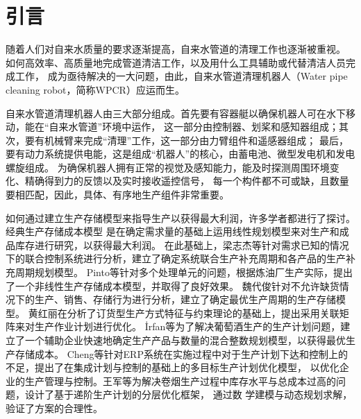 %
%
%
%
%

\chapter{引言}

随着人们对自来水质量的要求逐渐提高，自来水管道的清理工作也逐渐被重视。
如何高效率、高质量地完成管道清洁工作，以及用什么工具辅助或代替清洁人员完成工作，
成为亟待解决的一大问题，由此，自来水管道清理机器人（Water pipe cleaning robot，简称WPCR）应运而生。

自来水管道清理机器人由三大部分组成。首先要有容器艇以确保机器人可在水下移动，能在“自来水管道”环境中运作，
这一部分由控制器、划桨和感知器组成；其次，要有机械臂来完成“清理”工作，这一部分由力臂组件和遥感器组成；
最后，要有动力系统提供电能，这是组成“机器人”的核心，由蓄电池、微型发电机和发电螺旋组成。
为确保机器人拥有正常的视觉及感知能力，能及时探测周围环境变化、精确得到力的反馈以及实时接收遥控信号，
每一个构件都不可或缺，且数量要相匹配，因此，具体、有序地生产组件非常重要。

如何通过建立生产存储模型来指导生产以获得最大利润，许多学者都进行了探讨。
经典生产存储成本模型\cite{王周宏2011运筹学基础} 是在确定需求量的基础上运用线性规划模型来对生产和成品库存进行研究，以获得最大利润。
在此基础上，梁志杰等\cite{梁志杰2004联合生产存储问题的模拟退火算法}针对需求已知的情况下的联合控制系统进行分析，建立了确定系统联合生产补充周期和各产品的生产补充周期规划模型。
Pinto等\cite{pinto2000planning}针对多个处理单元的问题，根据炼油厂生产实际，提出了一个非线性生产存储成本模型，并取得了良好效果。
魏代俊\cite{魏代俊2006不允许缺货生产销售存储模型}针对不允许缺货情况下的生产、销售、存储行为进行分析，建立了确定最优生产周期的生产存储模型。
黄红丽\cite{黄红丽2009订单型企业基于约束理论的生产作业计划优化研究}在分析了订货型生产方式特征与约束理论的基础上，提出采用关联矩阵来对生产作业计划进行优化。
  İrfan等\cite{ertuugrul2009production}为了解决葡萄酒生产的生产计划问题，建立了一个辅助企业快速地确定生产产品与数量的混合整数规划模型，以获得最优生产存储成本。
Cheng等\cite{wang2013integrated}针对ERP系统在实施过程中对于生产计划下达和控制上的不足，提出了在集成计划与控制的基础上的多目标生产计划优化模型，
以优化企业的生产管理与控制。王军等\cite{王军2017基于卷烟生产计划优化}为解决卷烟生产过程中库存水平与总成本过高的问题，设计了基于递阶生产计划的分层优化框架，
通过数 学建模与动态规划求解，验证了方案的合理性。 

